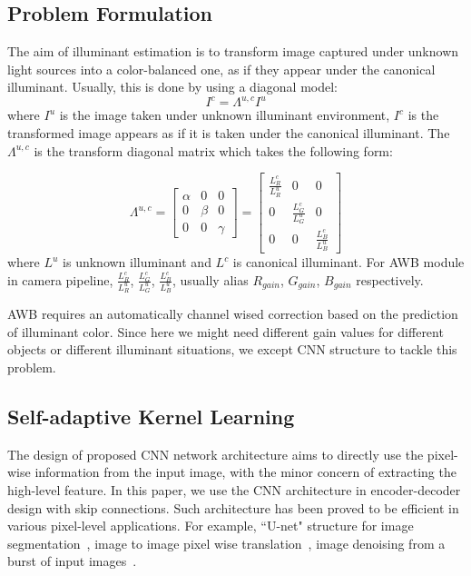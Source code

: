 \documentclass[10pt,twocolumn,letterpaper]{article}
\begin{document}
\subsection{Problem Formulation}
The aim of illuminant estimation is to transform image captured under unknown light sources
into a color-balanced one, as if they appear under the canonical illuminant.
Usually, this is done by using a diagonal model:
\begin{equation}
I^c = \Lambda^{u,c}I^{u}
\label{eq:illu}
\end{equation}
where $I^{u}$ is the image taken under unknown illuminant environment,
$I^{c}$ is the transformed image appears as if it is taken under the canonical illuminant.
The $\Lambda^{u,c}$ is the transform diagonal matrix which takes the following form:

\begin{equation}
\Lambda^{u,c} =
\left[
\begin{array}{ccc}
\alpha & 0 & 0\\
0 & \beta & 0\\
0 & 0 &\gamma
\end{array}
\right]
=
\left[
\begin{array}{ccc}
\frac{L_R^c}{L_R^{u}} & 0 & 0\\
0& \frac{L_G^c}{L_G^{u}} & 0\\
0 & 0 & \frac{L_B^c}{L_B^{u}}
\end{array}
\right]
\end{equation}
where $L^u$ is unknown illuminant and $L^{c}$ is canonical illuminant.
For AWB module in camera pipeline, $\frac{L_R^c}{L_R^{u}}$, $\frac{L_G^c}{L_G^{u}}$, $\frac{L_B^c}{L_B^{u}}$,
usually alias $R_{gain}$, $G_{gain}$, $B_{gain}$ respectively.

AWB requires an automatically channel wised correction based on the prediction of illuminant color.
Since here we might need different gain values for different objects or different illuminant situations,
we except CNN structure to tackle this problem.

\subsection{Self-adaptive Kernel Learning}
The design of proposed CNN network architecture aims to directly use the pixel-wise information from the input image,
with the minor concern of extracting the high-level feature.
In this paper, we use the CNN architecture in encoder-decoder design with skip connections.
Such architecture has been proved to be efficient in various pixel-level applications.
For example,
``U-net" structure for image segmentation~\cite{DBLP:journals/corr/RonnebergerFB15},
image to image pixel wise translation~\cite{isola2017image},
image denoising from a burst of input images~\cite{DBLP:journals/corr/abs-1712-02327}.
\end{document}
